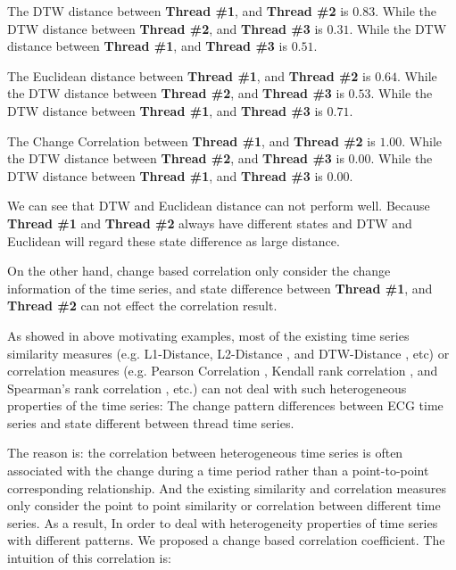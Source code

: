 The DTW distance between \textbf{Thread \#1}, and \textbf{Thread \#2} is $0.83$. While the DTW distance between \textbf{Thread \#2}, and \textbf{Thread \#3} is $0.31$. While the DTW distance between \textbf{Thread \#1}, and \textbf{Thread \#3} is $0.51$. 

The Euclidean distance between \textbf{Thread \#1}, and \textbf{Thread \#2} is $0.64$. While the DTW distance between \textbf{Thread \#2}, and \textbf{Thread \#3} is $0.53$. While the DTW distance between \textbf{Thread \#1}, and \textbf{Thread \#3} is $0.71$. 

The Change Correlation between \textbf{Thread \#1}, and \textbf{Thread \#2} is $1.00$. While the DTW distance between \textbf{Thread \#2}, and \textbf{Thread \#3} is $0.00$. 
While the DTW distance between \textbf{Thread \#1}, and \textbf{Thread \#3} is $0.00$. 

We can see that DTW and Euclidean distance can not perform well. Because \textbf{Thread \#1} and \textbf{Thread \#2} always have different states and DTW and Euclidean will regard these state difference as large distance.

On the other hand, change based correlation only consider the change information of the time series, and state difference between \textbf{Thread \#1}, and \textbf{Thread \#2} can not effect the correlation result.

As showed in above motivating examples, most of the existing time series similarity measures (e.g. L1-Distance, L2-Distance \cite{han2011data}, and DTW-Distance \cite{muller2007dynamic}, etc) or correlation measures (e.g. Pearson Correlation \cite{pearson1904mathematical}, Kendall rank correlation \cite{kendall1938new}, and Spearman's rank correlation \cite{pirie1988spearman}, etc.) can not deal with such heterogeneous properties of the time series: The change pattern differences between ECG time series and state different between thread time series.

The reason is: the correlation between heterogeneous time series is often associated with the change during a time period rather than a point-to-point corresponding relationship.
And the existing similarity and correlation measures only consider the point to point similarity or correlation between different time series.
As a result, In order to deal with heterogeneity properties of time series with different patterns.
We proposed a change based correlation coefficient.
The intuition of this correlation is:


